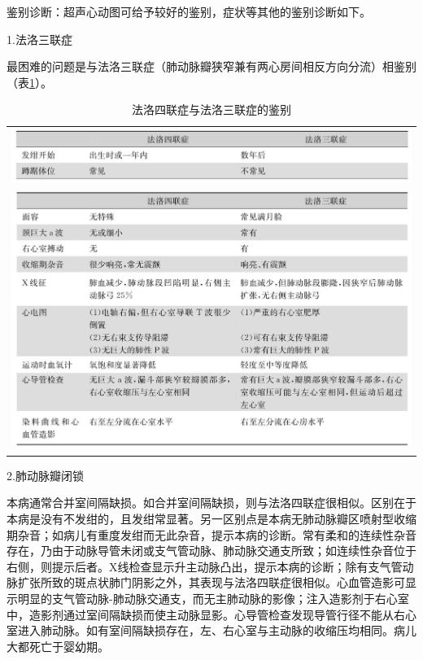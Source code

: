 鉴别诊断：超声心动图可给予较好的鉴别，症状等其他的鉴别诊断如下。

\hypertarget{text00120.htmlux5cux23CHP14-5-1-5-1-1-1}{}
1.法洛三联症

最困难的问题是与法洛三联症（肺动脉瓣狭窄兼有两心房间相反方向分流）相鉴别（表\ref{tab14-2}）。

\begin{longtable}{c}
 \caption{法洛四联症与法洛三联症的鉴别}
 \label{tab14-2}
 \endfirsthead
 \caption[]{法洛四联症与法洛三联症的鉴别}
 \endhead
 \includegraphics[width=\textwidth,height=\textheight,keepaspectratio]{./images/Image00093.jpg}\\
 \includegraphics[width=\textwidth,height=\textheight,keepaspectratio]{./images/Image00094.jpg}
 \end{longtable}

\hypertarget{text00120.htmlux5cux23CHP14-5-1-5-1-1-2}{}
2.肺动脉瓣闭锁

本病通常合并室间隔缺损。如合并室间隔缺损，则与法洛四联症很相似。区别在于本病是没有不发绀的，且发绀常显著。另一区别点是本病无肺动脉瓣区喷射型收缩期杂音；如病儿有重度发绀而无此杂音，提示本病的诊断。常有柔和的连续性杂音存在，乃由于动脉导管未闭或支气管动脉、肺动脉交通支所致；如连续性杂音位于右侧，则提示后者。X线检查显示升主动脉凸出，提示本病的诊断；除有支气管动脉扩张所致的斑点状肺门阴影之外，其表现与法洛四联症很相似。心血管造影可显示明显的支气管动脉-肺动脉交通支，而无主肺动脉的影像；注入造影剂于右心室中，造影剂通过室间隔缺损而使主动脉显影。心导管检查发现导管行径不能从右心室进入肺动脉。如有室间隔缺损存在，左、右心室与主动脉的收缩压均相同。病儿大都死亡于婴幼期。

